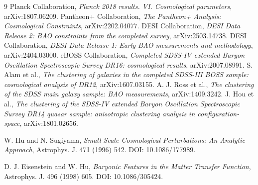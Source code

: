 \documentclass[11pt]{article}
\begin{document}
\begin{thebibliography}{9}
Planck Collaboration, \emph{Planck 2018 results. VI. Cosmological parameters}, arXiv:1807.06209.
Pantheon+ Collaboration, \emph{The Pantheon+ Analysis: Cosmological Constraints}, arXiv:2202.04077.
DESI Collaboration, \emph{DESI Data Release 2: BAO constraints from the completed survey}, arXiv:2503.14738.
DESI Collaboration, \emph{DESI Data Release 1: Early BAO measurements and methodology}, arXiv:2404.03000.
eBOSS Collaboration, \emph{Completed SDSS-IV extended Baryon Oscillation Spectroscopic Survey DR16: cosmological results}, arXiv:2007.08991.
S. Alam et al., \emph{The clustering of galaxies in the completed SDSS-III BOSS sample: cosmological analysis of DR12}, arXiv:1607.03155.
A. J. Ross et al., \emph{The clustering of the SDSS main galaxy sample: BAO measurements}, arXiv:1409.3242.
J. Hou et al., \emph{The clustering of the SDSS-IV extended Baryon Oscillation Spectroscopic Survey DR14 quasar sample: anisotropic clustering analysis in configuration-space}, arXiv:1801.02656.

W. Hu and N. Sugiyama, \emph{Small-Scale Cosmological Perturbations: An Analytic Approach}, Astrophys. J. 471 (1996) 542. DOI: 10.1086/177989.

D. J. Eisenstein and W. Hu, \emph{Baryonic Features in the Matter Transfer Function}, Astrophys. J. 496 (1998) 605. DOI: 10.1086/305424.
\end{thebibliography}
\end{document}
